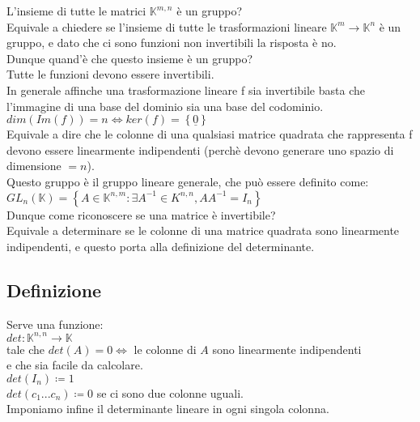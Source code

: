 \documentclass[a4paper, twoside, italian, 11pt]{book}
\newcommand{\braces}[1] {\left \{ #1 \right \}}
\newcommand{\K}{\mathbb K}
\begin{document}
L'insieme di tutte le matrici $\K^{m,n}$ è un gruppo? \\
Equivale a chiedere se l'insieme di tutte le trasformazioni lineare $\K^m \rightarrow \K^n$ è un gruppo, e dato che ci sono funzioni non invertibili la risposta è no. \\


\noindent
Dunque quand'è che questo insieme è un gruppo? \\

\noindent
Tutte le funzioni devono essere invertibili. \\

\noindent
In generale affinche una trasformazione lineare f sia invertibile basta che l'immagine di una base del dominio sia una base del codominio. \\

\noindent
$dim(Im(f)) = n \iff ker(f) = \braces{\underline 0}$ \\

\noindent
Equivale a dire che le colonne di una qualsiasi matrice quadrata che rappresenta f devono essere linearmente indipendenti (perchè devono generare uno spazio di dimensione $= n$). \\

\noindent
Questo gruppo è il gruppo lineare generale, che può essere definito come: \\

$GL_n(\K) = \braces{A \in \K^{n,m} : \exists A^{-1} \in K^{n,n}, A A^{-1} = I_n}$ \\

\noindent
Dunque come riconoscere se una matrice è invertibile? \\

\noindent
Equivale a determinare se le colonne di una matrice quadrata sono linearmente indipendenti, e questo porta alla definizione del determinante. \\


\subsection{Definizione}

Serve una funzione: \\

$det : \K^{n,n} \rightarrow \K$ \\

\noindent
tale che $det(A) = 0 \iff$ le colonne di $A$ sono linearmente indipendenti \\

\noindent
e che sia facile da calcolare. \\

$det(I_n) \coloneqq 1$ \\

$det(c_1 ... c_n) \coloneqq 0$ se ci sono due colonne uguali. \\ %

Imponiamo infine il determinante lineare in ogni singola colonna. %
\end{document}
